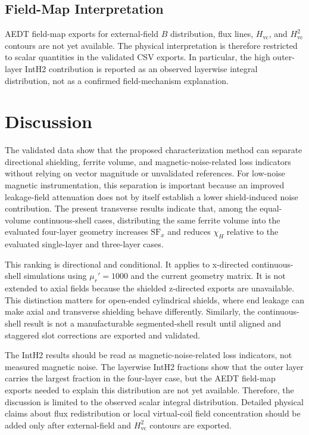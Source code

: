 \documentclass[letterpaper,journal]{IEEEtran}
\begin{document}
\subsection{Field-Map Interpretation}

AEDT field-map exports for external-field $B$ distribution, flux lines, $H_{\mathrm{vc}}$, and $H_{\mathrm{vc}}^2$ contours are not yet available. The physical interpretation is therefore restricted to scalar quantities in the validated CSV exports. In particular, the high outer-layer IntH2 contribution is reported as an observed layerwise integral distribution, not as a confirmed field-mechanism explanation.

\section{Discussion}

The validated data show that the proposed characterization method can separate directional shielding, ferrite volume, and magnetic-noise-related loss indicators without relying on vector magnitude or unvalidated references. For low-noise magnetic instrumentation, this separation is important because an improved leakage-field attenuation does not by itself establish a lower shield-induced noise contribution. The present transverse results indicate that, among the equal-volume continuous-shell cases, distributing the same ferrite volume into the evaluated four-layer geometry increases $\mathrm{SF}_x$ and reduces $\chi_H$ relative to the evaluated single-layer and three-layer cases.

This ranking is directional and conditional. It applies to x-directed continuous-shell simulations using $\mu_r'=1000$ and the current geometry matrix. It is not extended to axial fields because the shielded z-directed exports are unavailable. This distinction matters for open-ended cylindrical shields, where end leakage can make axial and transverse shielding behave differently. Similarly, the continuous-shell result is not a manufacturable segmented-shell result until aligned and staggered slot corrections are exported and validated.

The IntH2 results should be read as magnetic-noise-related loss indicators, not measured magnetic noise. The layerwise IntH2 fractions show that the outer layer carries the largest fraction in the four-layer case, but the AEDT field-map exports needed to explain this distribution are not yet available. Therefore, the discussion is limited to the observed scalar integral distribution. Detailed physical claims about flux redistribution or local virtual-coil field concentration should be added only after external-field and $H_{\mathrm{vc}}^2$ contours are exported.
\end{document}
